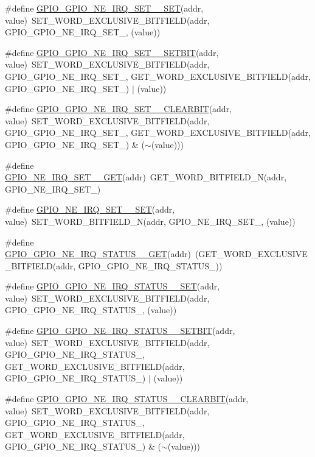 \begin{DoxyCompactItemize}
\item 
\#define \hyperlink{a00554_a3e6318e1fbb68c0f7a2021ccd54ed88a}{GPIO\_\-GPIO\_\-NE\_\-IRQ\_\-SET\_\_\-SET}(addr, value)~SET\_\-WORD\_\-EXCLUSIVE\_\-BITFIELD(addr, GPIO\_\-GPIO\_\-NE\_\-IRQ\_\-SET\_, (value))
\item 
\#define \hyperlink{a00554_a092b91a26f97293bb43486e0973aad25}{GPIO\_\-GPIO\_\-NE\_\-IRQ\_\-SET\_\_\-SETBIT}(addr, value)~SET\_\-WORD\_\-EXCLUSIVE\_\-BITFIELD(addr, GPIO\_\-GPIO\_\-NE\_\-IRQ\_\-SET\_, GET\_\-WORD\_\-EXCLUSIVE\_\-BITFIELD(addr, GPIO\_\-GPIO\_\-NE\_\-IRQ\_\-SET\_) $|$ (value))
\item 
\#define \hyperlink{a00554_a8808d0554a5987c91cf14190dba8a771}{GPIO\_\-GPIO\_\-NE\_\-IRQ\_\-SET\_\_\-CLEARBIT}(addr, value)~SET\_\-WORD\_\-EXCLUSIVE\_\-BITFIELD(addr, GPIO\_\-GPIO\_\-NE\_\-IRQ\_\-SET\_, GET\_\-WORD\_\-EXCLUSIVE\_\-BITFIELD(addr, GPIO\_\-GPIO\_\-NE\_\-IRQ\_\-SET\_) \& ($\sim$(value)))
\item 
\#define \hyperlink{a00554_a9a0e7c81930add0e42a6c108c829b5fd}{GPIO\_\-NE\_\-IRQ\_\-SET\_\_\-GET}(addr)~GET\_\-WORD\_\-BITFIELD\_\-N(addr, GPIO\_\-NE\_\-IRQ\_\-SET\_)
\item 
\#define \hyperlink{a00554_ab31de3bf969488373ac2d7401cbc8e03}{GPIO\_\-NE\_\-IRQ\_\-SET\_\_\-SET}(addr, value)~SET\_\-WORD\_\-BITFIELD\_\-N(addr, GPIO\_\-NE\_\-IRQ\_\-SET\_, (value))
\item 
\#define \hyperlink{a00554_a65130908570269a52820a2c4f5020e30}{GPIO\_\-GPIO\_\-NE\_\-IRQ\_\-STATUS\_\_\-GET}(addr)~(GET\_\-WORD\_\-EXCLUSIVE\_\-BITFIELD(addr, GPIO\_\-GPIO\_\-NE\_\-IRQ\_\-STATUS\_))
\item 
\#define \hyperlink{a00554_a438b28b2ab7cb6e5cedc20e1c014d613}{GPIO\_\-GPIO\_\-NE\_\-IRQ\_\-STATUS\_\_\-SET}(addr, value)~SET\_\-WORD\_\-EXCLUSIVE\_\-BITFIELD(addr, GPIO\_\-GPIO\_\-NE\_\-IRQ\_\-STATUS\_, (value))
\item 
\#define \hyperlink{a00554_a2dcfa1d7721af1fb311639842031caa7}{GPIO\_\-GPIO\_\-NE\_\-IRQ\_\-STATUS\_\_\-SETBIT}(addr, value)~SET\_\-WORD\_\-EXCLUSIVE\_\-BITFIELD(addr, GPIO\_\-GPIO\_\-NE\_\-IRQ\_\-STATUS\_, GET\_\-WORD\_\-EXCLUSIVE\_\-BITFIELD(addr, GPIO\_\-GPIO\_\-NE\_\-IRQ\_\-STATUS\_) $|$ (value))
\item 
\#define \hyperlink{a00554_a9db430f51038f214a96270a7b2a322b9}{GPIO\_\-GPIO\_\-NE\_\-IRQ\_\-STATUS\_\_\-CLEARBIT}(addr, value)~SET\_\-WORD\_\-EXCLUSIVE\_\-BITFIELD(addr, GPIO\_\-GPIO\_\-NE\_\-IRQ\_\-STATUS\_, GET\_\-WORD\_\-EXCLUSIVE\_\-BITFIELD(addr, GPIO\_\-GPIO\_\-NE\_\-IRQ\_\-STATUS\_) \& ($\sim$(value)))

\end{DoxyCompactItemize}
